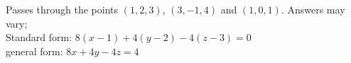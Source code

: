 {Passes through the points $(1,2,3)$, $(3,-1,4)$ and $(1,0,1)$.
}
{Answers may vary;\\
Standard form: $8(x-1)+4(y-2)-4(z-3)=0$\\
general form: $8x+4y-4z=4$
}

